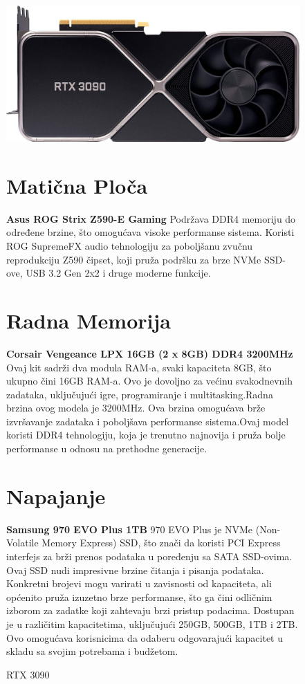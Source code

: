 \documentclass{article}
\begin{document}
\begin{figure}

    \includegraphics[width=0.3\linewidth]{61wbV8oqAbL.jpg}
    \caption{RTX 3090}
    \label{fig:enter-label}


\maketitle
\section {Matična Ploča}

\textbf{Asus ROG Strix Z590-E Gaming}
Podržava DDR4 memoriju do određene brzine, što omogućava visoke performanse sistema.
 Koristi ROG SupremeFX audio tehnologiju za poboljšanu zvučnu reprodukciju
 Z590 čipset, koji pruža podršku za brze NVMe SSD-ove, USB 3.2 Gen 2x2 i druge moderne funkcije.
 \maketitle
\section {Radna Memorija}
\textbf{Corsair Vengeance LPX 16GB (2 x 8GB) DDR4 3200MHz}
Ovaj kit sadrži dva modula RAM-a, svaki kapaciteta 8GB, što ukupno čini 16GB RAM-a. Ovo je dovoljno za većinu svakodnevnih zadataka, uključujući igre, programiranje i multitasking.Radna brzina ovog modela je 3200MHz. Ova brzina omogućava brže izvršavanje zadataka i poboljšava performanse sistema.Ovaj model koristi DDR4 tehnologiju, koja je trenutno najnovija i pruža bolje performanse u odnosu na prethodne generacije.


\maketitle
\section {Napajanje}
\textbf{Samsung 970 EVO Plus 1TB}
970 EVO Plus je NVMe (Non-Volatile Memory Express) SSD, što znači da koristi PCI Express interfejs za brži prenos podataka u poređenju sa SATA SSD-ovima.
Ovaj SSD nudi impresivne brzine čitanja i pisanja podataka. Konkretni brojevi mogu varirati u zavisnosti od kapaciteta, ali općenito pruža izuzetno brze performanse, što ga čini odličnim izborom za zadatke koji zahtevaju brzi pristup podacima.
Dostupan je u različitim kapacitetima, uključujući 250GB, 500GB, 1TB i 2TB. Ovo omogućava korisnicima da odaberu odgovarajući kapacitet u skladu sa svojim potrebama i budžetom.

\end{figure}
\end{document}

